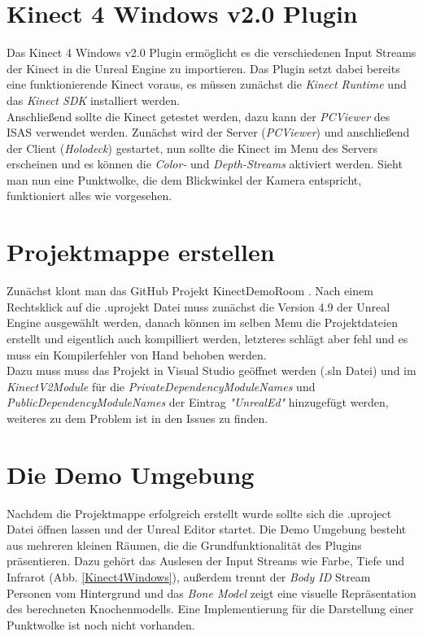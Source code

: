 \documentclass[a4paper]{IEEEtran}
\begin{document}
	
\section{Kinect 4 Windows v2.0 Plugin}
	Das Kinect 4 Windows v2.0 Plugin ermöglicht es die verschiedenen Input Streams der Kinect in die Unreal Engine zu importieren. Das Plugin setzt dabei bereits eine funktionierende Kinect voraus, es müssen zunächst die {\textit{Kinect Runtime}} {\cite{kinectruntime}} und das {\textit{Kinect SDK}} {\cite{kinectsdk}} installiert werden. \\
	Anschließend sollte die Kinect getestet werden, dazu kann der {\textit{PCViewer}} des ISAS verwendet werden. 
	Zunächst wird der Server ({\textit{PCViewer}}) und anschließend der Client ({\textit{Holodeck}}) gestartet, nun sollte die Kinect im Menu des Servers erscheinen und es können die {\textit{Color-}} und {\textit{Depth-Streams}} aktiviert werden. 
	Sieht man nun eine Punktwolke, die dem Blickwinkel der Kamera entspricht, funktioniert alles wie vorgesehen.\\
	

\section{Projektmappe erstellen}
	Zunächst klont man das GitHub Projekt KinectDemoRoom {\cite{k4w}}. 
	Nach einem Rechtsklick auf die .uprojekt Datei muss zunächst die Version 4.9 der Unreal Engine ausgewählt werden, danach können im selben Menu die Projektdateien erstellt und eigentlich auch kompilliert werden, letzteres schlägt aber fehl und es muss ein Kompilerfehler von Hand behoben werden. \\
	Dazu muss muss das Projekt in Visual Studio geöffnet werden (.sln Datei) und  im {\textit{KinectV2Module}} für die {\textit{PrivateDependencyModuleNames}} und {\textit{PublicDependencyModuleNames}} der Eintrag {\textit{"{}UnrealEd"{}}} hinzugefügt werden, weiteres zu dem Problem ist in den Issues {\cite{k4wissues}} zu finden.\\

\section{Die Demo Umgebung}
	Nachdem die Projektmappe erfolgreich erstellt wurde sollte sich die .uproject Datei öffnen lassen und der Unreal Editor startet. 
	Die Demo Umgebung besteht aus mehreren kleinen Räumen, die die Grundfunktionalität des Plugins präsentieren. 
	Dazu gehört das Auslesen der Input Streams wie Farbe, Tiefe und Infrarot (Abb. \ref{Kinect4Windows}), außerdem trennt der {\textit{Body ID}} Stream Personen vom Hintergrund und das {\textit{Bone Model}} zeigt eine visuelle Repräsentation des berechneten Knochenmodells. 
	Eine Implementierung für die Darstellung einer Punktwolke ist noch nicht vorhanden. \\[0.5cm]
	
\end{document}
